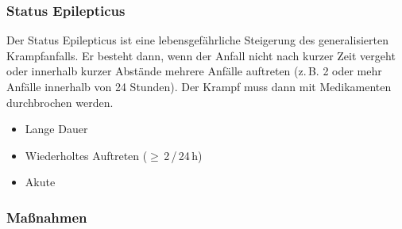 \subsubsection{Status Epilepticus}
{
Der Status Epilepticus ist eine
lebensgefährliche Steigerung
des generalisierten Krampfanfalls. Er besteht dann, wenn der
Anfall nicht nach kurzer Zeit vergeht oder innerhalb kurzer
Abstände mehrere Anfälle auftreten (z.\,B. 2 oder mehr Anfälle
innerhalb von 24 Stunden). Der Krampf muss dann mit Medikamenten
durchbrochen werden.
}
{
\begin{itemize}
  \item Lange Dauer
  \item Wiederholtes Auftreten ($\geq$\,2\,/\,24\,h)
  \item Akute 
\end{itemize}
}{}{}{}

{}


\subsubsection{Maßnahmen}


